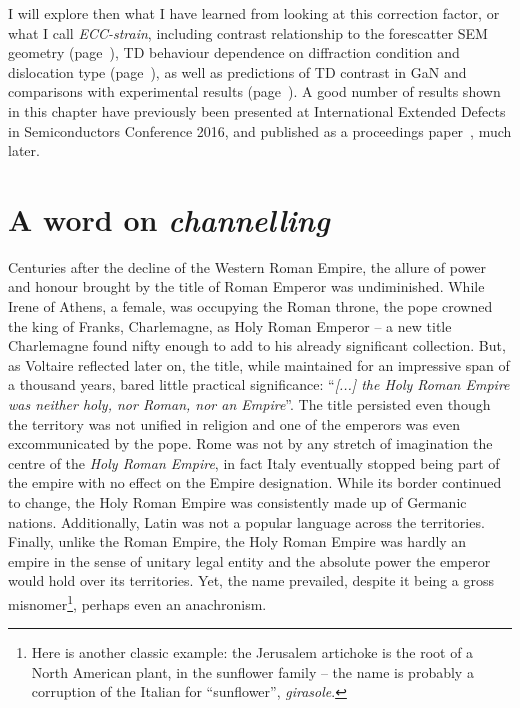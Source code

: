 I will explore then what I have learned from looking at this correction factor, or what I call \textit{ECC-strain}, including contrast relationship to the forescatter SEM geometry (page~\pageref{sec:tilteffect}), TD behaviour dependence on diffraction condition and dislocation type (page~\pageref{sec:betacomparisons}), as well as predictions of TD contrast in GaN and comparisons with experimental results (page~\pageref{sec:contrastGaN}). A good number of results shown in this chapter have previously been presented at International Extended Defects in Semiconductors Conference 2016, and published as a proceedings paper~\cite{ElenaECCI}, much later.

\section{A word on \textit{channelling}}
\label{sec:channelling}



Centuries after the decline of the Western Roman Empire, the allure of power and honour brought by the title of Roman Emperor was undiminished. While Irene of Athens, a female, was occupying the Roman throne, the pope crowned the king of Franks, Charlemagne, as Holy Roman Emperor -- a new title Charlemagne found nifty enough to add to his already significant collection. But, as Voltaire reflected later on, the title, while maintained for an impressive span of a thousand years, bared little practical significance: ``\textit{[...] the Holy Roman Empire was neither holy, nor Roman, nor an Empire}''. The title persisted even though the territory was not unified in religion and one of the emperors was even excommunicated by the pope. Rome was not by any stretch of imagination the centre of the \textit{Holy Roman Empire}, in fact Italy eventually stopped being part of the empire with no effect on the Empire designation. While its border continued to change, the Holy Roman Empire was consistently made up of Germanic nations. Additionally, Latin was not a popular language across the territories. Finally, unlike the Roman Empire, the Holy Roman Empire was hardly an empire in the sense of unitary legal entity and the absolute power the emperor would hold over its territories. Yet, the name prevailed, despite it being a gross misnomer\footnote{Here is another classic example: the Jerusalem artichoke is the root of a North American plant, in the sunflower family -- the name is probably a corruption of the Italian for ``sunflower'', \textit{girasole}.}, perhaps even an anachronism. 

